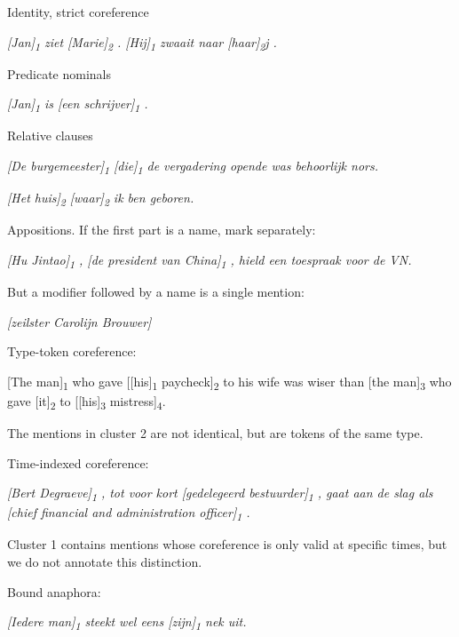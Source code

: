 \begin{itemize*}
\item Identity, strict coreference

    \emph{[Jan]\textsubscript{1} ziet [Marie]\textsubscript{2} .
    [Hij]\textsubscript{1} zwaait naar [haar]\textsubscript{2}j .}

\item Predicate nominals

  \emph{{[}Jan{]}\textsubscript{1} is {[}een schrijver{]}\textsubscript{1} .}

\item Relative clauses

    \emph{[De burgemeester]\textsubscript{1} {[}die{]}\textsubscript{1} de vergadering opende was behoorlijk nors.}

    \emph{[Het huis]\textsubscript{2} [waar]\textsubscript{2} ik ben geboren.}

\item Appositions. If the first part is a name, mark separately:

  \emph{{[}Hu Jintao{]}\textsubscript{1} , {[}de president van China{]}\textsubscript{1} , hield een
  toespraak voor de VN.}
  
  But a modifier followed by a name is a single mention:
  
  \emph{{[}zeilster Carolijn Brouwer{]}}
  
\item Type-token coreference:

  {[}The man{]}\textsubscript{1} who gave {[}{[}his{]}\textsubscript{1} paycheck{]}\textsubscript{2} to
  his wife was wiser than {[}the man{]}\textsubscript{3} who gave {[}it{]}\textsubscript{2} to
  [{[}his{]}\textsubscript{3} mistress]\textsubscript{4}.
  
  The mentions in cluster 2 are not identical, but are tokens of the
  same type.
  
\item Time-indexed coreference:

  \emph{{[}Bert Degraeve{]}\textsubscript{1} , tot voor kort {[}gedelegeerd
  bestuurder{]}\textsubscript{1} , gaat aan de slag als {[}chief financial and
  administration officer{]}\textsubscript{1} .}
  
  Cluster 1 contains mentions whose coreference is only valid at
  specific times, but we do not annotate this distinction.
\item Bound anaphora:

  \emph{{[}Iedere man{]}\textsubscript{1} steekt wel eens {[}zijn{]}\textsubscript{1} nek uit.}
  
\end{itemize*}

